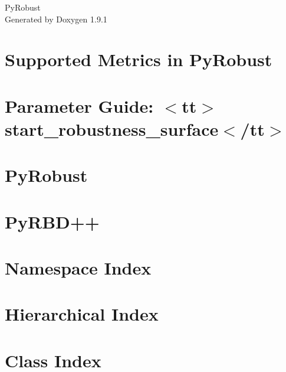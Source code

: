 \let\mypdfximage\pdfximage\def\pdfximage{\immediate\mypdfximage}\documentclass[twoside]{book}
\newcommand{\+}{\discretionary{\mbox{\scriptsize$\hookleftarrow$}}{}{}}
\newcommand{\clearemptydoublepage}{%
  \newpage{\pagestyle{empty}\cleardoublepage}%
}
\begin{document}
\raggedbottom

\hypersetup{pageanchor=false,
             bookmarksnumbered=true,
             pdfencoding=unicode
            }
\begin{titlepage}
\vspace*{7cm}
\begin{center}%
{\Large Py\+Robust }\\
\vspace*{1cm}
{\large Generated by Doxygen 1.9.1}\\
\end{center}
\end{titlepage}
\clearemptydoublepage
{}
\tableofcontents
\clearemptydoublepage
{}
\hypersetup{pageanchor=true}

\chapter{Supported Metrics in Py\+Robust}
\label{md_metrics}

\chapter{Parameter Guide\+: $<$tt$>$start\+\_\+robustness\+\_\+surface$<$/tt$>$}
\label{md_parameters}

\chapter{Py\+Robust}
\label{md_README}

\chapter{Py\+RBD++}
\label{md_rs_metrics_availability_evaluation_README}

\chapter{Namespace Index}

\chapter{Hierarchical Index}

\chapter{Class Index}

\end{document}
